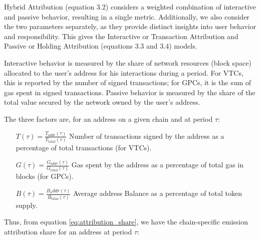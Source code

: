 \documentclass[11pt]{report}
\begin{document}
Hybrid Attribution (equation 3.2) considers a weighted combination of interactive and passive behavior, resulting in a single metric. Additionally, we also consider the two parameters separately, as they provide distinct insights into user behavior and responsibility. This gives the Interactive or Transaction Attribution and Passive or Holding Attribution (equations 3.3 and 3.4) models.

Interactive behavior is measured by the share of network resources (block space) allocated to the user's address for his interactions during a period. For \ac{VTC}s, this is reported by the number of signed transactions; for \ac{GPC}s, it is the sum of gas spent in signed transactions. Passive behavior is measured by the share of the total value secured by the network owned by the user's address.

The three factors are, for an address on a given chain and at period $\tau$:

\begin{description}[leftmargin=!, labelwidth=\widthof{\bfseries Passive Behavior}]

    \item[Interactive Behavior $(I)$] \hfill
        \begin{itemize}[labelwidth=4cm, align=left, labelsep=0pt]
            \item[\( T(\tau) = \frac{T_{addr}(\tau)}{T_{\text{total}}(\tau)} \)]
                Number of transactions signed by the address as a percentage of total transactions (for VTCs).

            \item[\(G(\tau) = \frac{G_{addr}(\tau)}{G_{\text{total}}(\tau)} \)]
                Gas spent by the address as a percentage of total gas in blocks (for GPCs).
        \end{itemize}

    \item[Passive Behavior $P$] \hfil
        \begin{itemize}[labelwidth=4cm, align=left, labelsep=0pt]
            \item[\(B(\tau) = \frac{B_addr(\tau)}{B_{\text{total}}(\tau)} \)]
                Average address Balance as a percentage of total token supply.
        \end{itemize}

\end{description}
\parsep 5pt
Thus, from equation \eqref{eq:attribution_share}, we have the chain-specific emission attribution share for an address at period $\tau$:
\end{document}
